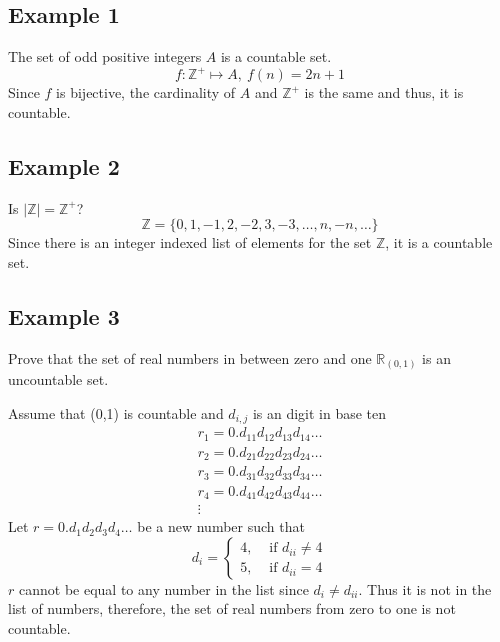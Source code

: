 \documentclass{article}
\theoremstyle{mytheoremstyle}
\theoremstyle{mytheoremstyle}
\theoremstyle{myproblemstyle}
\begin{document}
    \subsection*{Example 1}
    The set of odd positive integers $A$ is a countable set.
    \[
        f: \mathbb{Z}^+ \mapsto A,\ f(n) = 2n+1
    \]
    Since $f$ is bijective, the cardinality of $A$ and $\mathbb{Z}^+$ is the
    same and thus, it is countable.

    \subsection*{Example 2}
    Is $|\mathbb{Z}| = \mathbb{Z}^+$?
    \[
        \mathbb{Z} = \{0, 1, -1, 2, -2, 3, -3, \dots, n, -n, \dots\}
    \]
    Since there is an integer indexed list of elements for the set $\mathbb{Z}$,
    it is a countable set.

    \subsection*{Example 3}
    Prove that the set of real numbers in between zero and one
    $\mathbb{R}_{(0,1)}$ is an uncountable set.

    Assume that (0,1) is countable and $d_{i,j}$ is an digit in base ten
    \begin{align*}
        r_{1} = 0.d_{11}d_{12}d_{13}d_{14}\dots \\
        r_{2} = 0.d_{21}d_{22}d_{23}d_{24}\dots \\
        r_{3} = 0.d_{31}d_{32}d_{33}d_{34}\dots \\
        r_{4} = 0.d_{41}d_{42}d_{43}d_{44}\dots \\
        \vdots
    \end{align*}
    Let $r=0.d_1d_2d_3d_4\dots$ be a new number such that
    \[
        d_i = \begin{cases}
            4, &\text{ if } d_{ii} \ne 4 \\
            5, &\text{ if } d_{ii} = 4
        \end{cases}
    \]
    $r$ cannot be equal to any number in the list since $d_i \ne d_{ii}$. Thus
    it is not in the list of numbers, therefore, the set of real numbers from
    zero to one is not countable.
\end{document}
